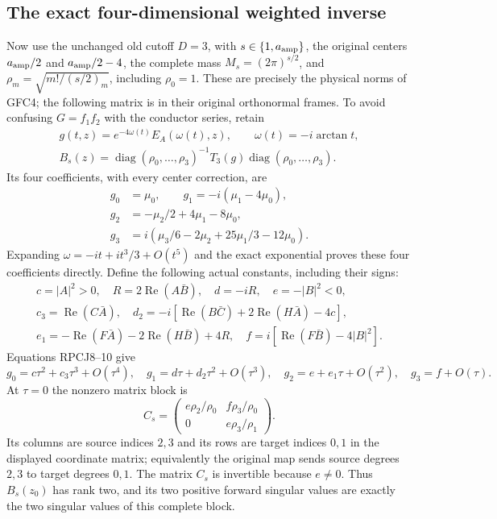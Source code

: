 \subsection{The exact four-dimensional weighted inverse}
Now use the unchanged old cutoff $D=3$, with $s\in\{1,a_{\rm amp}\}$,
the original centers $a_{\rm amp}/2$ and $a_{\rm amp}/2-4$,
the complete mass $M_s=(2\pi)^{s/2}$, and
$\rho_m=\sqrt{m!/(s/2)_m}$, including $\rho_0=1$.
These are precisely the physical norms of GFC4; the following matrix
is in their original orthonormal frames.
To avoid confusing $G=f_1f_2$ with the conductor series, retain
\[
 \begin{gathered}
 g(t,z)=e^{-4\omega(t)}E_A(\omega(t),z),\qquad
 \omega(t)=-i\arctan t,\\
 B_s(z)=\operatorname{diag}(\rho_0,\ldots,\rho_3)^{-1}
           T_3(g)\operatorname{diag}(\rho_0,\ldots,\rho_3).
 \end{gathered}
 \tag{RPCJ9}
\]
Its four coefficients, with every center correction, are
\[
 \begin{split}
 g_0&=\mu_0,\qquad g_1=-i(\mu_1-4\mu_0),\\
 g_2&=-\mu_2/2+4\mu_1-8\mu_0,\\
 g_3&=i(\mu_3/6-2\mu_2+25\mu_1/3-12\mu_0).
 \end{split}\tag{RPCJ10}
\]
Expanding $\omega=-it+it^3/3+O(t^5)$ and the exact exponential
proves these four coefficients directly.
Define the following actual constants, including their signs:
\[
 \begin{gathered}
 c=|A|^2>0,\quad R=2\operatorname{Re}(A\bar B),\quad
 d=-iR,\quad e=-|B|^2<0,\\
 c_3=\operatorname{Re}(C\bar A),\quad
 d_2=-i[\operatorname{Re}(B\bar C)+2\operatorname{Re}(H\bar A)-4c],\\
 e_1=-\operatorname{Re}(F\bar A)-2\operatorname{Re}(H\bar B)+4R,
 \quad f=i[\operatorname{Re}(F\bar B)-4|B|^2].
 \end{gathered}\tag{RPCJ11}
\]
Equations RPCJ8--10 give
\[
 g_0=c\tau^2+c_3\tau^3+O(\tau^4),\quad
 g_1=d\tau+d_2\tau^2+O(\tau^3),\quad
 g_2=e+e_1\tau+O(\tau^2),\quad g_3=f+O(\tau).
 \tag{RPCJ12}
\]
At $\tau=0$ the nonzero matrix block is
\[
 C_s=\begin{pmatrix}
 e\rho_2/\rho_0&f\rho_3/\rho_0\\
 0&e\rho_3/\rho_1
 \end{pmatrix}.
 \tag{RPCJ13}
\]
Its columns are source indices $2,3$ and its rows are target indices
$0,1$ in the displayed coordinate matrix; equivalently the original
map sends source degrees $2,3$ to target degrees $0,1$.
The matrix $C_s$ is invertible because $e\ne0$.
Thus $B_s(z_0)$ has rank two, and its two positive forward singular
values are exactly the two singular values of this complete block.

